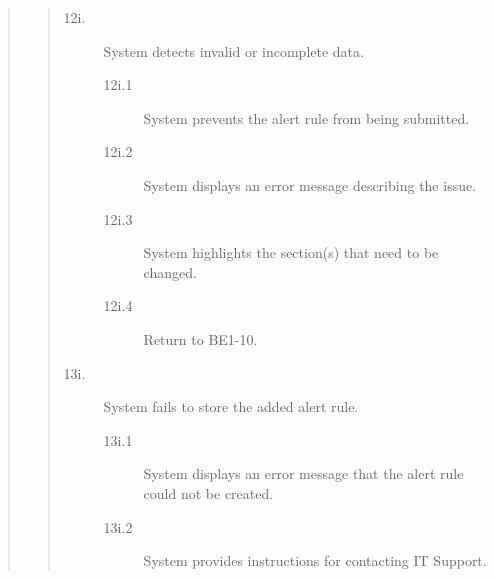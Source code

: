 \documentclass[]{article}
\begin{document}
\begin{enumerate}[{\bf BE1.}]
\begin{quote}
\begin{quote}
                    \begin{description}
                        \item[\textmd{12i.}] System detects invalid or incomplete data.
                        \begin{description}
                            \item[\textmd{12i.1}] System prevents the alert rule from being submitted.
                            \item[\textmd{12i.2}] System displays an error message describing the issue.
                            \item[\textmd{12i.3}] System highlights the section(s) that need to be changed.
                            \item[\textmd{12i.4}] Return to BE1-10.
                        \end{description}
                        \item[\textmd{13i.}] System fails to store the added alert rule.
                        \begin{description}
                            \item[\textmd{13i.1}] System displays an error message that the alert rule could not be created.
                            \item[\textmd{13i.2}] System provides instructions for contacting IT Support.
                        \end{description}
                    \end{description}
                \end{quote}
        	\end{quote}
\end{enumerate}
\end{document}
